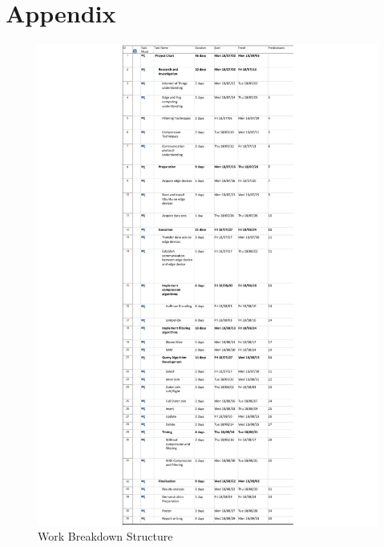 \documentclass[11pt,journal, a4paper]{IEEEtran}
\begin{document}
\section*{Appendix}
\begin{center}
\begin{figure}[H]
\includegraphics[scale = 0.8]{WBSPROJECT}
\caption{Work Breakdown Structure}
\end{figure}
\end{center}





\end{document}
